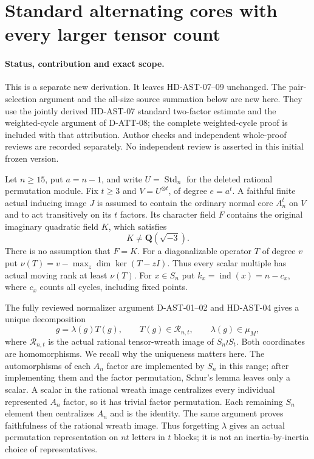 \section{Standard alternating cores with every larger tensor count}
\label{sec:standard-all-tensors}

\paragraph{Status, contribution and exact scope.}
This is a separate new derivation.  It leaves HD-AST-07--09 unchanged.
The pair-selection argument and the all-size source summation below are
new here.  They use the jointly derived HD-AST-07 standard two-factor
estimate and the weighted-cycle argument of D-ATT-08; the complete
weighted-cycle proof is included with that attribution.  Author checks
and independent whole-proof reviews are recorded separately.  No
independent review is asserted in this initial frozen version.

Let $n\ge15$, put $a=n-1$, and write $U=\operatorname{Std}_n$
for the deleted rational permutation module.  Fix $t\ge3$ and
$V=U^{\otimes t}$, of degree $e=a^t$.  A faithful finite actual
inducing image $J$ is assumed to contain the ordinary normal core
$A_n^t$ on $V$ and to act transitively on its $t$ factors.  Its
character field $F$ contains the original imaginary quadratic field
$K$, which satisfies
\[
                    K\ne\mathbf Q(\sqrt{-3}).                 \tag{AST3.1}
\]
There is no assumption that $F=K$.  For a diagonalizable operator
$T$ of degree $v$ put
$\nu(T)=v-\max_z\dim\ker(T-zI)$.  Thus every scalar multiple
has actual moving rank at least $\nu(T)$.  For $x\in S_n$ put
$k_x=\operatorname{ind}(x)=n-c_x$, where $c_x$ counts all cycles,
including fixed points.

The fully reviewed normalizer argument D-AST-01--02 and
HD-AST-04 gives a unique decomposition
\[
             g=\lambda(g)T(g),\qquad
 T(g)\in\mathcal R_{n,t},\qquad \lambda(g)\in\mu_M,              \tag{AST3.2}
\]
where $\mathcal R_{n,t}$ is the actual rational tensor-wreath image
of $S_n\wr S_t$.  Both coordinates are homomorphisms.  We recall
why the uniqueness matters here.  The automorphisms of each $A_n$
factor are implemented by $S_n$ in this range; after implementing
them and the factor permutation, Schur's lemma leaves only a scalar.
A scalar in the rational wreath image centralizes every individual
represented $A_n$ factor, so it has trivial factor permutation.
Each remaining $S_n$ element then centralizes $A_n$ and is the
identity.  The same argument proves faithfulness of the rational
wreath image.  Thus forgetting $\lambda$ gives an actual
permutation representation on $nt$ letters in $t$ blocks; it is
not an inertia-by-inertia choice of representatives.

